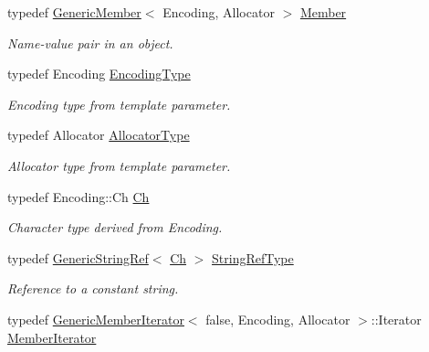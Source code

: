 \begin{DoxyCompactItemize}
typedef \hyperlink{a02000}{Generic\+Member}$<$ Encoding, Allocator $>$ \hyperlink{a01992_a7ccf27c44058b4c11c3efc6473afb886}{Member}
\begin{DoxyCompactList}\small\item\em Name-\/value pair in an object. \end{DoxyCompactList}\item 
\mbox{\label{a01992_a28c2cb8d04d12566c1af37597a46d209}} 
typedef Encoding \hyperlink{a01992_a28c2cb8d04d12566c1af37597a46d209}{Encoding\+Type}
\begin{DoxyCompactList}\small\item\em Encoding type from template parameter. \end{DoxyCompactList}\item 
\mbox{\label{a01992_a7beb83860c1b8d2a0e2a7da9796b2fa1}} 
typedef Allocator \hyperlink{a01992_a7beb83860c1b8d2a0e2a7da9796b2fa1}{Allocator\+Type}
\begin{DoxyCompactList}\small\item\em Allocator type from template parameter. \end{DoxyCompactList}\item 
\mbox{\label{a01992_ade0e0ce64ccd5d852da57a35e720bafb}} 
typedef Encoding\+::\+Ch \hyperlink{a01992_ade0e0ce64ccd5d852da57a35e720bafb}{Ch}
\begin{DoxyCompactList}\small\item\em Character type derived from Encoding. \end{DoxyCompactList}\item 
\mbox{\label{a01992_a32e0f30ee278072374c8168b14d3317f}} 
typedef \hyperlink{a02008}{Generic\+String\+Ref}$<$ \hyperlink{a01992_ade0e0ce64ccd5d852da57a35e720bafb}{Ch} $>$ \hyperlink{a01992_a32e0f30ee278072374c8168b14d3317f}{String\+Ref\+Type}
\begin{DoxyCompactList}\small\item\em Reference to a constant string. \end{DoxyCompactList}\item 
\mbox{\label{a01992_a349b8faae61edc42b4289726820be439}} 
typedef \hyperlink{a02004}{Generic\+Member\+Iterator}$<$ false, Encoding, Allocator $>$\+::Iterator \hyperlink{a01992_a349b8faae61edc42b4289726820be439}{Member\+Iterator}

\end{DoxyCompactItemize}
